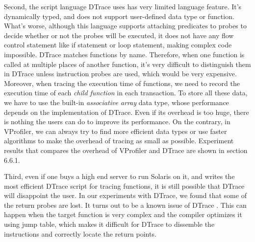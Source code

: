 Second, the script language DTrace uses has very limited language feature. It's
dynamically typed, and does not support user-defined data type or function.
What's worse, although this language supports attaching predicates to probes to
decide whether or not the probes will be executed, it does not have any flow
control statement like if statement or loop statement, making complex code
impossible. DTrace matches functions by name. Therefore, when one function is
called at multiple places of another function, it's very difficult to
distinguish them in DTrace unless instruction probes are used, which would be
very expensive. Moreover, when tracing the execution time of functions, we
need to record the execution time of each \textit{child function} in each
transaction. To store all these data, we have to use the built-in 
\textit{associative array} data type, whose performance depends on the
implementation of DTrace. Even if its overhead is too huge, there is nothing
the users can do to improve its performance. On the contrary, in VProfiler, we
can always try to find more efficient data types or use faster algorithms to
make the overhead of tracing as small as possible. Experiment results that
compares the overhead of VProfiler and DTrace are shown in section 6.6.1. 

Third, even if one buys a high end server to run Solaris on it, and writes the
most efficient DTrace script for tracing functions, it is still possible that
DTrace will disappoint the user. In our experiments with DTrace, we found that
some of the return probes are lost. It turns out to be a known issue of 
DTrace \cite{brendan:dtrace}. This can happen when the target function is very
complex and the compiler optimizes it using jump table, which makes it
difficult for DTrace to dissemble the instructions and correctly locate the
return points.



